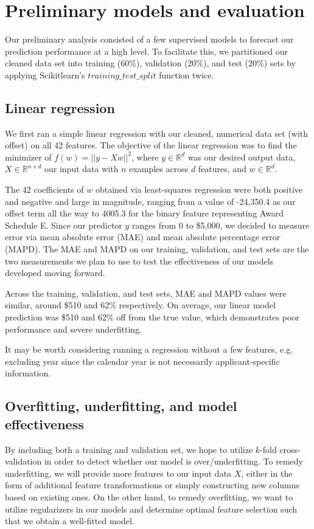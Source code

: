 \documentclass[11pt, fleqn]{article}
\begin{document}
\section{Preliminary models and evaluation}
Our preliminary analysis consisted of a few supervised models to forecast our prediction performance at a high level. To facilitate this, we partitioned our cleaned data set into training (60\%), validation (20\%), and test (20\%) sets by applying Scikitlearn's $training\_test\_split$ function twice.


\subsection{Linear regression}
We first ran a simple linear regression with our cleaned, numerical data set (with offset) on all 42 features. The objective of the linear regression was to find the minimizer of $f(w) = ||y - Xw||^2$, where $y \in \mathbb{R}^{d}$ was our desired output data, $X \in \mathbb{R}^{n \times d}$ our input data with $n$ examples across $d$ features, and $w \in \mathbb{R}^{d}$.

The 42 coefficients of $w$ obtained via least-squares regression were both positive and negative and large in magnitude, ranging from a value of -24,350.4 as our offset term all the way to 4005.3 for the binary feature representing Award Schedule E. Since our predictor $y$ ranges from 0 to \$5,000, we decided to measure error via mean absolute error (MAE) and mean absolute percentage error (MAPD). The MAE and MAPD on our training, validation, and test sets are the two measurements we plan to use to test the effectiveness of our models developed moving forward.

Across the training, validation, and test sets, MAE and MAPD values were similar, around \$510 and 62\% respectively. On average, our linear model prediction was \$510 and 62\% off from the true value, which demonstrates poor performance and severe underfitting.

It may be worth considering running a regression without a few features, e.g. excluding year since the calendar year is not necessarily applicant-specific information.

\subsection{Overfitting, underfitting, and model effectiveness}
By including both a training and validation set, we hope to utilize $k$-fold cross-validation in order to detect whether our model is over/underfitting. To remedy underfitting, we will provide more features to our input data $X$, either in the form of additional feature transformations or simply constructing new columns based on existing ones. On the other hand, to remedy overfitting, we want to utilize regularizers in our models and determine optimal feature selection such that we obtain a well-fitted model.
\end{document}
